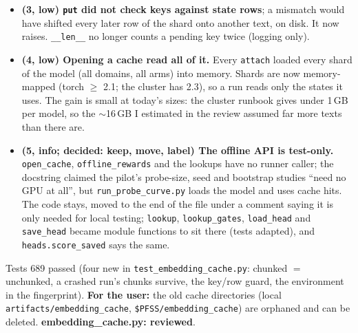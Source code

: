 \documentclass{article}
\begin{document}
\begin{itemize}
        CLAUDE.md and the cluster runbook is replaced.
  \item \textbf{(3, low) \texttt{put} did not check keys against state rows}; a mismatch would have shifted every
        later row of the shard onto another text, on disk. It now raises. \texttt{\_\_len\_\_} no longer counts a
        pending key twice (logging only).
  \item \textbf{(4, low) Opening a cache read all of it.} Every \texttt{attach} loaded every shard of the model
        (all domains, all arms) into memory. Shards are now memory-mapped (torch $\geq$ 2.1; the cluster has 2.3),
        so a run reads only the states it uses. The gain is small at today's sizes: the cluster runbook gives
        under 1\,GB per model, so the $\sim$16\,GB I estimated in the review assumed far more texts than there are.
  \item \textbf{(5, info; decided: keep, move, label) The offline API is test-only.} \texttt{open\_cache},
        \texttt{offline\_rewards} and the lookups have no runner caller; the docstring claimed the pilot's
        probe-size, seed and bootstrap studies ``need no GPU at all'', but \texttt{run\_probe\_curve.py} loads the
        model and uses cache hits. The code stays, moved to the end of the file under a comment saying it is only
        needed for local testing; \texttt{lookup}, \texttt{lookup\_gates}, \texttt{load\_head} and
        \texttt{save\_head} became module functions to sit there (tests adapted), and \texttt{heads.score\_saved}
        says the same.
\end{itemize}
Tests 689 passed (four new in \texttt{test\_embedding\_cache.py}: chunked $=$ unchunked, a crashed run's chunks
survive, the key/row guard, the environment in the fingerprint). \textbf{For the user:} the old cache
directories (local \texttt{artifacts/embedding\_cache}, \texttt{\$PFSS/embedding\_cache}) are orphaned and can be
deleted. \textbf{embedding\_cache.py: reviewed}.
\end{document}
